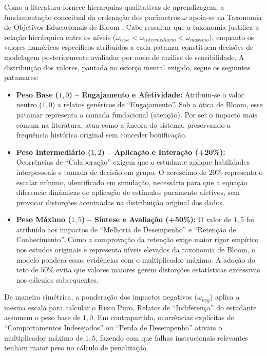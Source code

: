 Como a literatura fornece hierarquias qualitativas de aprendizagem, a fundamentação conceitual da ordenação dos parâmetros $\omega$ apoia-se na Taxonomia de Objetivos Educacionais de Bloom \cite{anderson2001taxonomy, ferraz2010taxonomia}. Cabe ressaltar que a taxonomia justifica a relação hierárquica entre os níveis ($\omega_{base} < \omega_{intermediario} < \omega_{maximo}$), enquanto os valores numéricos específicos atribuídos a cada patamar constituem decisões de modelagem posteriormente avaliadas por meio de análise de sensibilidade. A distribuição dos valores, pautada no esforço mental exigido, segue os seguintes patamares:

\begin{itemize}
    \item \textbf{Peso Base ($1,0$) -- Engajamento e Afetividade:} Atribuiu-se o valor neutro ($1,0$) a relatos genéricos de ``Engajamento''. Sob a ótica de Bloom, esse patamar representa a camada fundacional (atenção). Por ser o impacto mais comum na literatura, atua como a âncora do sistema, preservando a frequência histórica original sem conceder bonificação.
    \item \textbf{Peso Intermediário ($1,2$) -- Aplicação e Interação (+20\%):} Ocorrências de ``Colaboração'' exigem que o estudante aplique habilidades interpessoais e tomada de decisão em grupo. O acréscimo de $20\%$ representa o escalar mínimo, identificado em simulação, necessário para que a equação diferencie dinâmicas de aplicação de estímulos puramente afetivos, sem provocar distorções acentuadas na distribuição original dos dados.
    \item \textbf{Peso Máximo ($1,5$) -- Síntese e Avaliação (+50\%):} O valor de $1,5$ foi atribuído aos impactos de ``Melhoria de Desempenho'' e ``Retenção de Conhecimento''. Como a comprovação da retenção exige maior rigor empírico nos estudos originais e representa níveis elevados da taxonomia de Bloom, o modelo pondera essas evidências com o multiplicador máximo. A adoção do teto de $50\%$ evita que valores maiores gerem distorções estatísticas excessivas nos cálculos subsequentes.
\end{itemize}


De maneira simétrica, a ponderação dos impactos negativos ($\omega_{neg}$) aplica a mesma escala para calcular o Risco Puro. Relatos de ``Indiferença'' do estudante assumem o peso base de $1,0$. Em contrapartida, ocorrências explícitas de ``Comportamentos Indesejados'' ou ``Perda de Desempenho'' ativam o multiplicador máximo de $1,5$, fazendo com que falhas instrucionais relevantes tenham maior peso no cálculo de penalização.

